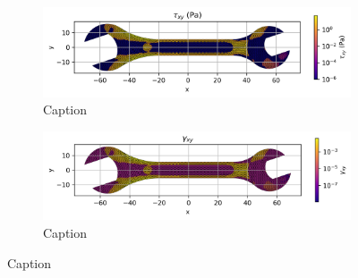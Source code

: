   \begin{figure}[H]
    \centering
    \begin{subfigure}[t]{0.49\textwidth}
      \centering
      \includegraphics[width=\textwidth]{GRAFICOS/Case c - tau_xy_per_element.png}
      \caption{Caption}
      \label{fig:deformada_reacciones}
    \end{subfigure}

    \hfill

    \begin{subfigure}[t]{0.49\textwidth}
      \centering
      \includegraphics[width=\textwidth]{GRAFICOS/Case c - gamma_xy_per_element.png}
      \caption{Caption}
      \label{fig:von_mises}

    \end{subfigure}
    \caption{Caption}
    \label{fig:analisis_estructural}
    \end{figure}


